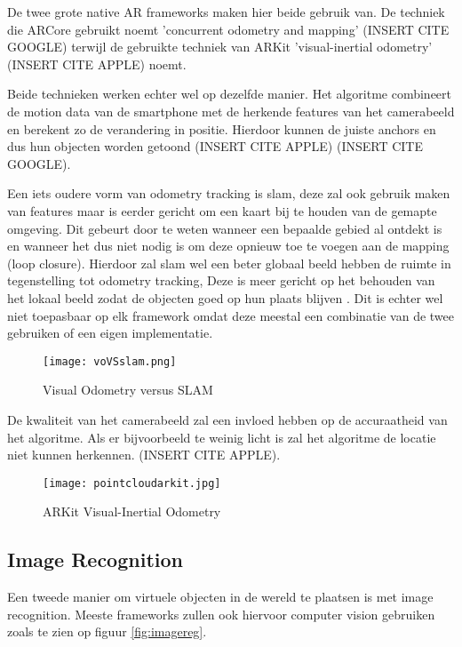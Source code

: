 De twee grote native AR frameworks maken hier beide gebruik van. De techniek die ARCore gebruikt noemt 'concurrent odometry and mapping' (INSERT CITE GOOGLE) terwijl de gebruikte techniek van ARKit 'visual-inertial odometry' (INSERT CITE APPLE) noemt. 

Beide technieken werken echter wel op dezelfde manier. Het algoritme combineert de motion data van de smartphone met de herkende features van het camerabeeld en berekent zo de verandering in positie. Hierdoor kunnen de juiste anchors en dus hun objecten worden getoond (INSERT CITE APPLE) (INSERT CITE GOOGLE).

Een iets oudere vorm van odometry tracking is \acrfull{slam}, deze zal ook gebruik maken van features maar is eerder gericht om een kaart bij te houden van de gemapte omgeving. Dit gebeurt door te weten wanneer een bepaalde gebied al ontdekt is en wanneer het dus niet nodig is om deze opnieuw toe te voegen aan de mapping (loop closure). Hierdoor zal \acrshort{slam} wel een beter globaal beeld hebben de ruimte in tegenstelling tot odometry tracking, Deze is meer gericht op het behouden van het lokaal beeld zodat de objecten goed op hun plaats blijven \autocite{Yousif2015}. Dit is echter wel niet toepasbaar op elk framework omdat deze meestal een combinatie van de twee gebruiken of een eigen implementatie.

\begin{figure}
    \texttt{[image: voVSslam.png]}
    \caption{Visual Odometry versus SLAM \autocite{Yousif2015}}
    \label{fig:voVSslam}
\end{figure}


De kwaliteit van het camerabeeld zal een invloed hebben op de accuraatheid van het algoritme. Als er bijvoorbeeld te weinig licht is zal het algoritme de locatie niet kunnen herkennen. (INSERT CITE APPLE).

\begin{figure}
    \texttt{[image: pointcloudarkit.jpg]}
    \caption{ARKit Visual-Inertial Odometry}
    \label{fig:pointcloudarkit}
\end{figure}


\subsection{Image Recognition}
Een tweede manier om virtuele objecten in de wereld te plaatsen is met image recognition. Meeste frameworks zullen ook hiervoor computer vision gebruiken zoals te zien op figuur \ref{fig:imagereg}.

